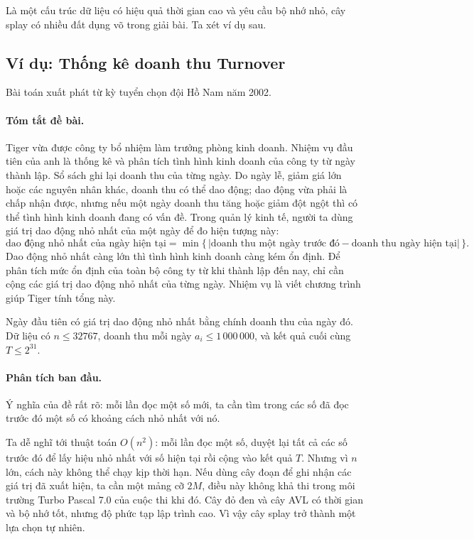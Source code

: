 \documentclass[11pt]{article}
\begin{document}
Là một cấu trúc dữ liệu có hiệu quả thời gian cao và yêu cầu bộ nhớ nhỏ, cây
splay có nhiều đất dụng võ trong giải bài. Ta xét ví dụ sau.

\subsection*{Ví dụ: Thống kê doanh thu Turnover}

Bài toán xuất phát từ kỳ tuyển chọn đội Hồ Nam năm 2002.

\paragraph{Tóm tắt đề bài.}
Tiger vừa được công ty bổ nhiệm làm trưởng phòng kinh doanh. Nhiệm vụ đầu
tiên của anh là thống kê và phân tích tình hình kinh doanh của công ty từ
ngày thành lập. Sổ sách ghi lại doanh thu của từng ngày. Do ngày lễ, giảm giá
lớn hoặc các nguyên nhân khác, doanh thu có thể dao động; dao động vừa phải
là chấp nhận được, nhưng nếu một ngày doanh thu tăng hoặc giảm đột ngột thì
có thể tình hình kinh doanh đang có vấn đề. Trong quản lý kinh tế, người ta
dùng giá trị dao động nhỏ nhất của một ngày để đo hiện tượng này:
\[
  \text{dao động nhỏ nhất của ngày hiện tại}
  =
  \min\{\,|\text{doanh thu một ngày trước đó}
          -\text{doanh thu ngày hiện tại}|\,\}.
\]
Dao động nhỏ nhất càng lớn thì tình hình kinh doanh càng kém ổn định. Để
phân tích mức ổn định của toàn bộ công ty từ khi thành lập đến nay, chỉ cần
cộng các giá trị dao động nhỏ nhất của từng ngày. Nhiệm vụ là viết chương
trình giúp Tiger tính tổng này.

Ngày đầu tiên có giá trị dao động nhỏ nhất bằng chính doanh thu của ngày đó.
Dữ liệu có $n\le 32767$, doanh thu mỗi ngày $a_i\le 1\,000\,000$, và kết quả
cuối cùng $T\le 2^{31}$.

\paragraph{Phân tích ban đầu.}
Ý nghĩa của đề rất rõ: mỗi lần đọc một số mới, ta cần tìm trong các số đã
đọc trước đó một số có khoảng cách nhỏ nhất với nó.

Ta dễ nghĩ tới thuật toán $O(n^2)$: mỗi lần đọc một số, duyệt lại tất cả các
số trước đó để lấy hiệu nhỏ nhất với số hiện tại rồi cộng vào kết quả $T$.
Nhưng vì $n$ lớn, cách này không thể chạy kịp thời hạn. Nếu dùng cây đoạn để
ghi nhận các giá trị đã xuất hiện, ta cần một mảng cỡ $2M$, điều này không
khả thi trong môi trường Turbo Pascal 7.0 của cuộc thi khi đó. Cây đỏ đen và
cây AVL có thời gian và bộ nhớ tốt, nhưng độ phức tạp lập trình cao. Vì vậy
cây splay trở thành một lựa chọn tự nhiên.
\end{document}
